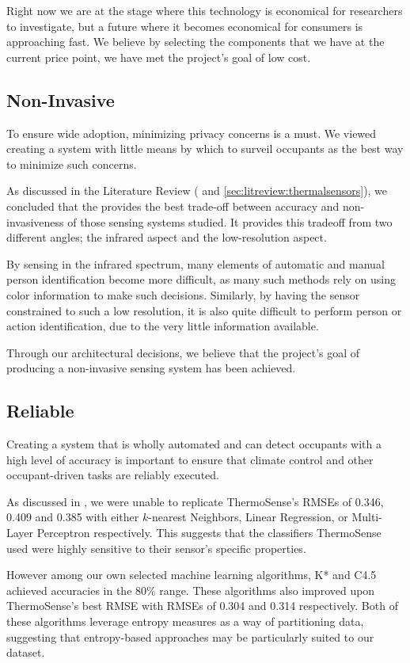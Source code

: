 \documentclass[../thesis/thesis.tex]{subfiles}
\begin{document}
Right now we are at the stage where this technology is economical for researchers to investigate, but a future where it becomes economical for consumers is approaching fast. We believe by selecting the components that we have at the current price point, we have met the project's goal of low cost.

\subsection{Non-Invasive}
To ensure wide adoption, minimizing privacy concerns is a must. We viewed creating a system with little means by which to  surveil occupants as the best way to minimize such concerns.

As discussed in the Literature Review ( and \ref{sec:litreview:thermalsensors}), we concluded that the \mlx provides the best trade-off between accuracy and non-invasiveness of those sensing systems studied. It provides this tradeoff from two different angles; the infrared aspect and the low-resolution aspect. 

By sensing in the infrared spectrum, many elements of automatic and manual person identification become more difficult, as many such methods rely on using color information to make such decisions. Similarly, by having the sensor constrained to such a low resolution, it is also quite difficult to perform person or action identification, due to the very little information available.

Through our architectural decisions, we believe that the project's goal of producing a non-invasive sensing system has been achieved.

\subsection{Reliable}
Creating a system that is wholly automated and can detect occupants with a high level of accuracy is important to ensure that climate control and other occupant-driven tasks are reliably executed.

As discussed in , we were unable to replicate ThermoSense's RMSEs of 0.346, 0.409 and 0.385 with either $k$-nearest Neighbors, Linear Regression, or Multi-Layer Perceptron respectively. This suggests that the classifiers ThermoSense used were highly sensitive to their sensor's specific properties.

However among our own selected machine learning algorithms, K* and C4.5 achieved accuracies in the 80\% range. These algorithms also improved upon ThermoSense's best RMSE with RMSEs of 0.304 and 0.314 respectively. Both of these algorithms leverage entropy measures as a way of partitioning data, suggesting that entropy-based approaches may be particularly suited to our dataset.
\end{document}
